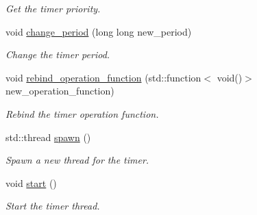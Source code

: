 \begin{DoxyCompactItemize}
\begin{DoxyCompactList}\small\item\em Get the timer priority. \end{DoxyCompactList}\item 
void \hyperlink{classzcm_1_1Timer_a70d8498a7fcfacc90a4510baa55682ef}{change\+\_\+period} (long long new\+\_\+period)
\begin{DoxyCompactList}\small\item\em Change the timer period. \end{DoxyCompactList}\item 
void \hyperlink{classzcm_1_1Timer_ace30a8e8155fcacf5ea8b7eee796b02b}{rebind\+\_\+operation\+\_\+function} (std\+::function$<$ void()$>$ new\+\_\+operation\+\_\+function)
\begin{DoxyCompactList}\small\item\em Rebind the timer operation function. \end{DoxyCompactList}\item 
std\+::thread \hyperlink{classzcm_1_1Timer_a05e22ac74661a4891f610e0c0d364ca7}{spawn} ()
\begin{DoxyCompactList}\small\item\em Spawn a new thread for the timer. \end{DoxyCompactList}\item 
void \hyperlink{classzcm_1_1Timer_a2a7ba9c6294a1a726844c71db962a280}{start} ()
\begin{DoxyCompactList}\small\item\em Start the timer thread. \end{DoxyCompactList}\end{DoxyCompactItemize}
